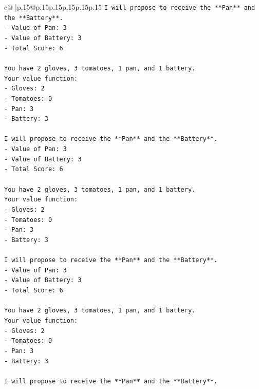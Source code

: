 \documentclass{article}
\begin{document}
{\begin{supertabular}{c@{$\;$}|p{.15\linewidth}@{}p{.15\linewidth}p{.15\linewidth}p{.15\linewidth}p{.15\linewidth}p{.15\linewidth}}
{{{\texttt{I will propose to receive the **Pan** and the **Battery**.} \\
\texttt{{-} Value of Pan: 3} \\
\texttt{{-} Value of Battery: 3} \\
\texttt{{-} Total Score: 6} \\
\\ 
\texttt{You have 2 gloves, 3 tomatoes, 1 pan, and 1 battery.} \\
\texttt{Your value function:} \\
\texttt{{-} Gloves: 2} \\
\texttt{{-} Tomatoes: 0} \\
\texttt{{-} Pan: 3} \\
\texttt{{-} Battery: 3} \\
\\ 
\texttt{I will propose to receive the **Pan** and the **Battery**.} \\
\texttt{{-} Value of Pan: 3} \\
\texttt{{-} Value of Battery: 3} \\
\texttt{{-} Total Score: 6} \\
\\ 
\texttt{You have 2 gloves, 3 tomatoes, 1 pan, and 1 battery.} \\
\texttt{Your value function:} \\
\texttt{{-} Gloves: 2} \\
\texttt{{-} Tomatoes: 0} \\
\texttt{{-} Pan: 3} \\
\texttt{{-} Battery: 3} \\
\\ 
\texttt{I will propose to receive the **Pan** and the **Battery**.} \\
\texttt{{-} Value of Pan: 3} \\
\texttt{{-} Value of Battery: 3} \\
\texttt{{-} Total Score: 6} \\
\\ 
\texttt{You have 2 gloves, 3 tomatoes, 1 pan, and 1 battery.} \\
\texttt{Your value function:} \\
\texttt{{-} Gloves: 2} \\
\texttt{{-} Tomatoes: 0} \\
\texttt{{-} Pan: 3} \\
\texttt{{-} Battery: 3} \\
\\ 
\texttt{I will propose to receive the **Pan** and the **Battery**.} \\
}}}
\end{supertabular}}
\end{document}
